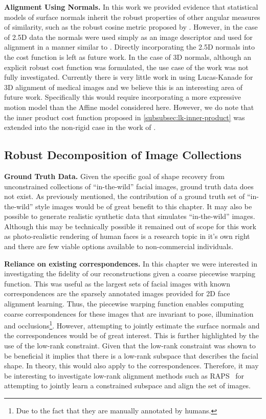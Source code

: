 \textbf{Alignment Using Normals.} In this work we provided evidence that
statistical models of surface normals inherit the robust properties of other
angular measures of similarity, such as the robust cosine metric
proposed by \citet{tzimiropoulos2012subspace}. However, in the case of 2.5D
data the normals were used simply as an image descriptor and used for
alignment in a manner similar to \citet{antonakos2015feature}. Directly
incorporating the 2.5D normals into the cost function is left as future work.
In the case of 3D normals, although an explicit robust cost function was
formulated, the use case of the work was not fully investigated. Currently
there is very little work in using Lucas-Kanade for 3D alignment of medical
images and we believe this is an interesting area of future work. Specifically
this would require incorporating a more expressive motion model than the Affine
model considered here. However, we do note that the inner product cost
function proposed in \cref{subsubsec:lk-inner-product} was extended into
the non-rigid case in the work of \citet{snape2016volumetric}.
\subsection{Robust Decomposition of Image Collections}
\textbf{Ground Truth Data.} Given the specific goal of shape recovery from
unconstrained collections of ``in-the-wild'' facial images, ground truth data
does not exist. As previously mentioned, the contribution of a ground truth
set of ``in-the-wild'' style images would be of great benefit to this chapter.
It may also be possible to generate realistic synthetic data that simulates
``in-the-wild'' images. Although this may be technically possible it remained
out of scope for this work as photo-realistic rendering of human faces
is a research topic in it's own right and there are few viable options available
to non-commercial individuals.

\textbf{Reliance on existing correspondences.} In this chapter we were interested
in investigating the fidelity of our reconstructions given a coarse piecewise
warping function. This was useful as the largest sets of facial images with
known correspondences are the sparsely annotated images provided for 2D
face alignment learning. Thus, the piecewise warping function enables
computing coarse correspondences for these images that are invariant to pose,
illumination and occlusions\footnote{Due to the fact that they are manually
annotated by humans.}. However, attempting to jointly estimate the surface
normals and the correspondences would be of great interest. This is further
highlighted by the use of the low-rank constraint. Given that the low-rank
constraint was shown to be beneficial it implies that there is a low-rank subspace
that describes the facial shape. In theory, this would also apply to the
correspondences. Therefore, it may be interesting to investigate low-rank
alignment methods such as RAPS~\citet{sagonas2014raps} for attempting to
jointly learn a constrained subspace and align the set of images.

